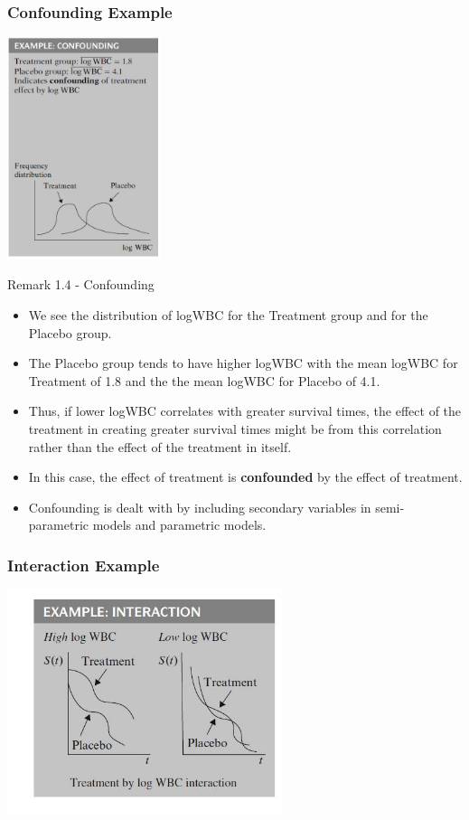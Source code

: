 \documentclass{beamer}
\theoremstyle{definition}
\begin{document}
\begin{frame}
\frametitle{Confounding Example} 
 \includegraphics[width =\textwidth, height=6.5cm]{Ch1_Confound.JPG}
 \end{frame} 

\begin{frame} 
\begin{block}{Remark 1.4 - Confounding} 
\begin{itemize}
\item We see the distribution of logWBC for the Treatment group and for the Placebo group. 
\item The Placebo group tends to have higher logWBC with the mean logWBC for Treatment of 1.8 and the the mean logWBC for Placebo of 4.1. 
\item Thus, if lower logWBC correlates with greater survival times, the effect of the treatment in creating greater survival times might be from this correlation rather than the effect of the treatment in itself. 
\item In this case, the effect of treatment is \textbf{confounded} by the effect of treatment. 
\item Confounding is dealt with by including secondary variables in semi-parametric models and parametric models.   
\end{itemize}
\end{block} 
\end{frame} 



\begin{frame}
\frametitle{Interaction Example}
 \includegraphics[width =\textwidth, height=6.5cm]{Ch1_Interact.JPG}
 \end{frame} 
 
\end{document}
